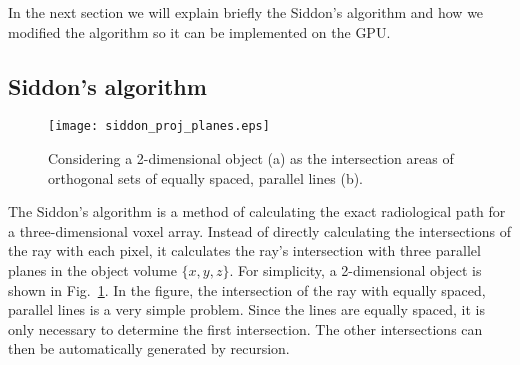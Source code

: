 In the next section we will explain briefly the Siddon's algorithm and how we modified the algorithm so it can be implemented on the GPU. 

\subsection{Siddon's algorithm}
%
\begin{figure}
\centering
\texttt{[image: siddon\_proj\_planes.eps]}
\caption{Considering a 2-dimensional object (a) as the intersection areas of orthogonal sets of equally spaced, parallel lines (b).}
\label{fig:forward_backward_model}
\end{figure}
%
The Siddon's algorithm is a method of calculating the exact radiological path for a three-dimensional voxel array.  Instead of directly calculating the intersections of the ray with each pixel, it calculates the ray's intersection with three parallel planes in the object volume $\{ x, y, z \}$.  For simplicity, a 2-dimensional object is shown in Fig.~\ref{fig:forward_backward_model}.  In the figure, the intersection of the ray with equally spaced, parallel lines is a very simple problem.  Since the lines are equally spaced, it is only necessary to determine the first intersection.  The other intersections can then be automatically generated by recursion.  

